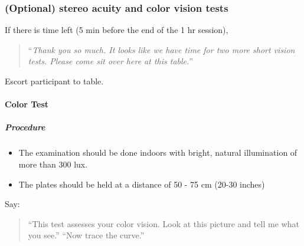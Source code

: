 \documentclass[]{article}
\providecommand{\tightlist}{%
  \setlength{\itemsep}{0pt}\setlength{\parskip}{0pt}}
\let\oldparagraph\paragraph
\renewcommand{\paragraph}[1]{\oldparagraph{#1}\mbox{}}
\let\oldsubparagraph\subparagraph
\renewcommand{\subparagraph}[1]{\oldsubparagraph{#1}\mbox{}}
\begin{document}
\subsubsection{(Optional) stereo acuity and color vision
tests}\label{optional-stereo-acuity-and-color-vision-tests}

If there is time left (5 min before the end of the 1 hr session),

\begin{quote}
``\emph{Thank you so much. It looks like we have time for two more short
vision tests. Please come sit over here at this table.}''
\end{quote}

Escort participant to table.

\paragraph{Color Test}\label{color-test}

\subparagraph{Procedure}\label{procedure-1}

\begin{itemize}
\tightlist
\item
  The examination should be done indoors with bright, natural
  illumination of more than 300 lux.
\item
  The plates should be held at a distance of 50 - 75 cm (20-30 inches)
\end{itemize}

Say:

\begin{quote}
``This test assesses your color vision. Look at this picture and tell me
what you see.'' ``Now trace the curve.''
\end{quote}
\end{document}
